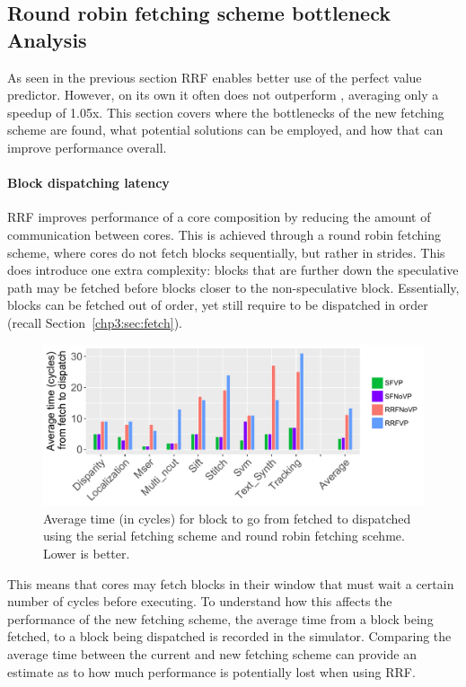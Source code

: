 \subsection{Round robin fetching scheme bottleneck Analysis}

As seen in the previous section RRF enables better use of the perfect value predictor. 
However, on its own it often does not outperform \novp{}, averaging only a speedup of 1.05x.
This section covers where the bottlenecks of the new fetching scheme are found, what potential solutions can be employed, and how that can improve performance overall.

\paragraph*{Block dispatching latency}

RRF improves performance of a core composition by reducing the amount of communication between cores.
This is achieved through a round robin fetching scheme, where cores do not fetch blocks sequentially, but rather in strides.
This does introduce one extra complexity: blocks that are further down the speculative path may be fetched before blocks closer to the non-speculative block.
Essentially, blocks can be fetched out of order, yet still require to be dispatched in order (recall Section~\ref{chp3:sec:fetch}).

\begin{figure}[t]
    \centering
    \includegraphics[width=1\textwidth]{chapter3/graphics/avTimeToFetch3.pdf}
    \caption{Average time (in cycles) for block to go from fetched to dispatched using the serial fetching scheme and round robin fetching scehme. Lower is better.}
    \label{fig:av_time}
	\vspace{1em}
\end{figure}

This means that cores may fetch blocks in their window that must wait a certain number of cycles before executing.
To understand how this affects the performance of the new fetching scheme, the average time from a block being fetched, to a block being dispatched is recorded in the simulator.
Comparing the average time between the current and new fetching scheme can provide an estimate as to how much performance is potentially lost when using RRF.

